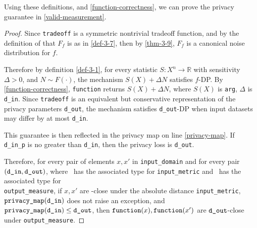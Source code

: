\documentclass{article}
\begin{document}
Using these definitions, and \ref{function-correctness},
we can prove the privacy guarantee in \ref{valid-measurement}.

\begin{proof}
Since \texttt{tradeoff} is a symmetric nontrivial tradeoff function, 
and by the definition of  that $F_f$ is as in \ref{def-3-7},
then by \ref{thm-3-9}, $F_f$ is a canonical noise distribution for $f$.

Therefore by definition \ref{def-3-1},
for every statistic $S: X^n\rightarrow \mathbb{R}$ with sensitivity $\Delta>0$, and $N\sim F(\cdot)$, 
the mechanism $S(X) + \Delta N$ satisfies $f$-DP.
By \ref{function-correctness}, \texttt{function} returns $S(X) + \Delta N$, where $S(X)$ is \texttt{arg}, $\Delta$ is \texttt{d\_in}.
Since \texttt{tradeoff} is an equivalent but conservative representation of the privacy parameters \texttt{d\_out},
the mechanism satisfies \texttt{d\_out}-DP when input datasets may differ by at most \texttt{d\_in}.

This guarantee is then reflected in the privacy map on line \ref{privacy-map}.
If \texttt{d\_in\_p} is no greater than \texttt{d\_in}, then the privacy loss is \texttt{d\_out}.

Therefore, for every pair of elements $x, x'$ in \texttt{input\_domain} and for every pair $(\texttt{d\_in}, \texttt{d\_out})$,
where \din\ has the associated type for \texttt{input\_metric} and \dout\ has the associated type for \\ \texttt{output\_measure},
if $x, x'$ are \din-close under the absolute distance \texttt{input\_metric}, $\texttt{privacy\_map}(\texttt{d\_in})$ does not raise an exception,
and $\texttt{privacy\_map}(\texttt{d\_in}) \leq \texttt{d\_out}$,
then $\texttt{function}(x), \texttt{function}(x')$ are $\texttt{d\_out}$-close under \texttt{output\_measure}.

\end{proof}
\printbibliography
\end{document}
